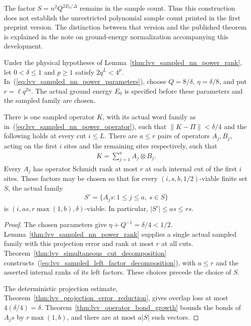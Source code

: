 The factor $S=n^2Q^{2E_0/\Delta}$ remains in the sample count. Thus this
construction does not establish the unrestricted polynomial sample count
printed in the first preprint version. The distinction between that
version and the published theorem is explained in the note on ground-energy
normalization accompanying this development.

\begin{lemma}
    \label{thm:lvv_sampled_left_error_reduction}
    \leanok
    Under the physical hypotheses of Lemma~\ref{thm:lvv_sampled_nn_power_rank},
    let $0<\delta\le1$ and $p\ge1$ satisfy $2q^L<4^p$.
    In~(\ref{eq:lvv_sampled_nn_power_parameters}), choose
    $Q=8/\delta$, $\eta=\delta/8$, and put $r=\ell q^{2u}$.
    The actual ground energy $E_0$ is specified before these parameters
    and the sampled family are chosen.

    There is one sampled operator $K$, with its actual word family as
    in~(\ref{eq:lvv_sampled_nn_power_operator}), such that
    $\|K-\Pi\|<\delta/4$ and the following holds at every cut $i\le L$.
    There are $a\le r$ pairs of operators $A_j,B_j$, acting on the first
    $i$ sites and the remaining sites respectively, such that
    \begin{align}
        K=\sum_{j=1}^{a}A_j\otimes B_j.
        \label{eq:lvv_sampled_left_factor_decomposition}
    \end{align}
    Every $A_j$ has operator Schmidt rank at most $r$ at each internal
    cut of the first $i$ sites. These factors may be chosen so that for
    every $(i,s,b,1/2)$-viable finite set $S$, the actual family
    \begin{align}
        S'=\{A_js:1\le j\le a,\ s\in S\}
        \label{eq:lvv_sampled_left_factor_family}
    \end{align}
    is $(i,as,r\max(1,b),\delta)$-viable.
    In particular, $|S'|\le as\le rs$.
\end{lemma}
\begin{proof}\leanok
    The chosen parameters give
    $\eta+Q^{-1}=\delta/4<1/2$.
    Lemma~\ref{thm:lvv_sampled_nn_power_rank} supplies a single actual
    sampled family with this projection error and rank at most $r$ at
    all cuts. Theorem~\ref{thm:lvv_simultaneous_cut_decomposition}
    constructs~(\ref{eq:lvv_sampled_left_factor_decomposition}), with
    $a\le r$ and the asserted internal ranks of its left factors.
    These choices precede the choice of $S$.

    The deterministic projection estimate,
    Theorem~\ref{thm:lvv_projection_error_reduction}, gives overlap loss
    at most $4(\delta/4)=\delta$.
    Theorem~\ref{thm:lvv_operator_bond_growth} bounds the bonds of
    $A_js$ by $r\max(1,b)$, and there are at most $a|S|$ such vectors.
\end{proof}

